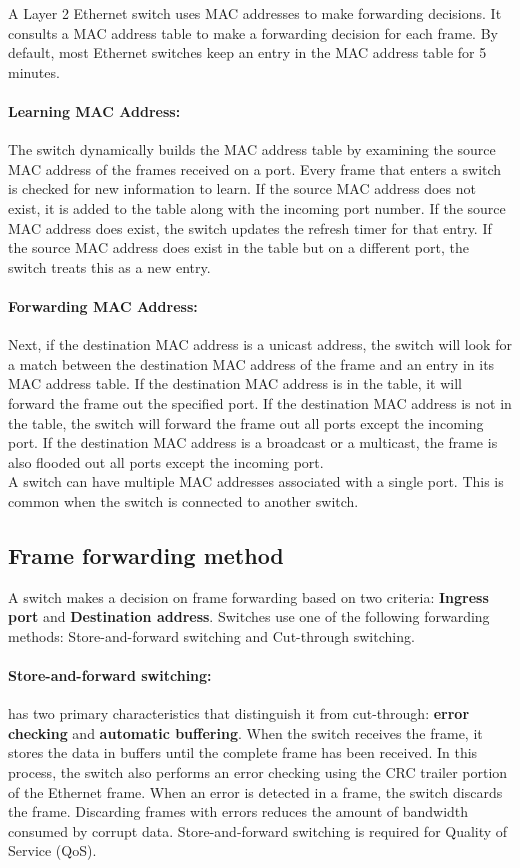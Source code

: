 A Layer 2 Ethernet switch uses MAC addresses to make forwarding decisions. It consults a MAC address table to make a forwarding decision for each frame. By default, most Ethernet switches keep an entry in the MAC address table for 5 minutes.

\paragraph{Learning MAC Address:} The switch dynamically builds the MAC address table by examining the source MAC address of the frames received on a port. Every frame that enters a switch is checked for new information to learn. If the source MAC address does not exist, it is added to the table along with the incoming port number. If the source MAC address does exist, the switch updates the refresh timer for that entry.  If the source MAC address does exist in the table but on a different port, the switch treats this as a new entry.

\paragraph{Forwarding MAC Address:} Next, if the destination MAC address is a unicast address, the switch will look for a match between the destination MAC address of the frame and an entry in its MAC address table. If the destination MAC address is in the table, it will forward the frame out the specified port. If the destination MAC address is not in the table, the switch will forward the frame out all ports except the incoming port. If the destination MAC address is a broadcast or a multicast, the frame is also flooded out all ports except the incoming port.\\

A switch can have multiple MAC addresses associated with a single port. This is common when the switch is connected to another switch.

\subsection{Frame forwarding method}

A switch makes a decision on frame forwarding based on two criteria: \textbf{Ingress port} and \textbf{Destination address}. Switches use one of the following forwarding methods:  Store-and-forward switching and Cut-through switching.

\paragraph{Store-and-forward switching:} has two primary characteristics that distinguish it from cut-through: \textbf{error checking} and \textbf{automatic buffering}. When the switch receives the frame, it stores the data in buffers until the complete frame has been received. In this process, the switch also performs an error checking using the CRC trailer portion of the Ethernet frame. When an error is detected in a frame, the switch discards the frame. Discarding frames with errors reduces the amount of bandwidth consumed by corrupt data. Store-and-forward switching is required for Quality of Service (QoS).

